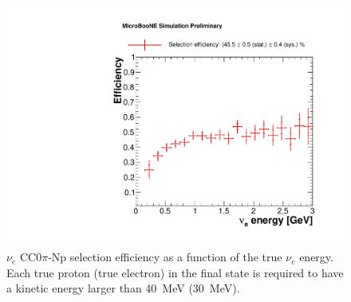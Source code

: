 \begin{figure}
\centering
    \includegraphics[width=0.8\linewidth]{figures/eff.pdf}
  \caption{$\nu_{e}$ CC$0\pi$-Np selection efficiency as a function of the true $\nu_{e}$ energy. Each true proton (true electron) in the final state is required to have a kinetic energy larger than 40~MeV (30~MeV).}
  \label{fig:effpurity}
\end{figure}

